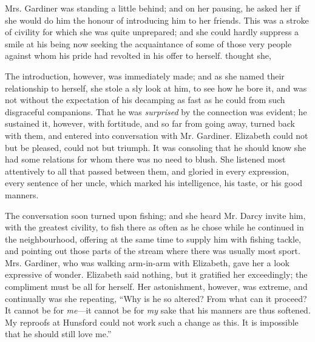 Mrs. Gardiner was standing a little behind; and on her pausing, he asked her if she would do him the honour of introducing him to her friends. This was a stroke of civility for which she was quite unprepared; and she could hardly suppress a smile at his being now seeking the acquaintance of some of those very people against whom his pride had revolted in his offer to herself.  thought she, 

The introduction, however, was immediately made; and as she named their relationship to herself, she stole a sly look at him, to see how he bore it, and was not without the expectation of his decamping as fast as he could from such disgraceful companions. That he was {\em surprised} by the connection was evident; he sustained it, however, with fortitude, and so far from going away, turned back with them, and entered into conversation with Mr. Gardiner. Elizabeth could not but be pleased, could not but triumph. It was consoling that he should know she had some relations for whom there was no need to blush. She listened most attentively to all that passed between them, and gloried in every expression, every sentence of her uncle, which marked his intelligence, his taste, or his good manners.

The conversation soon turned upon fishing; and she heard Mr. Darcy invite him, with the greatest civility, to fish there as often as he chose while he continued in the neighbourhood, offering at the same time to supply him with fishing tackle, and pointing out those parts of the stream where there was usually most sport. Mrs. Gardiner, who was walking arm-in-arm with Elizabeth, gave her a look expressive of wonder. Elizabeth said nothing, but it gratified her exceedingly; the compliment must be all for herself. Her astonishment, however, was extreme, and continually was she repeating, “Why is he so altered? From what can it proceed? It cannot be for {\em me}---it cannot be for {\em my} sake that his manners are thus softened. My reproofs at Hunsford could not work such a change as this. It is impossible that he should still love me.”

